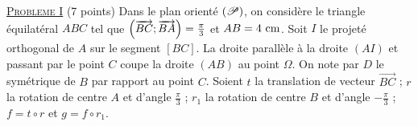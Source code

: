 \noindent \underline{\textsc{Probleme I}} (7 points) \newline
      Dans le plan orient\'e $(\mathscr{P})$, on consid\`ere le triangle \'equilat\'eral $ABC$ tel que 
      $\left( \overrightarrow{BC} ; \overrightarrow{BA} \right) = \frac{\pi}{3}$ et $AB = 4~\mathrm{cm}$.
      Soit $I$ le projet\'e orthogonal de $A$ sur le segment $[BC]$.
      La droite parall\`ele \`a la droite $(AI)$ et passant par le point $C$ coupe la droite $(AB)$ au point $\Omega$.
      On note par $D$ le sym\'etrique de $B$ par rapport au point $C$.
      Soient $t$ la translation de vecteur $\overrightarrow{BC}$ ; $r$ la rotation de centre $A$ et d'angle $\frac{\pi}{3}$ ;
      $r_1$ la rotation de centre $B$ et d'angle $-\frac{\pi}{3}$ ; $f = t \circ r$ et $g = f \circ r_1$.
